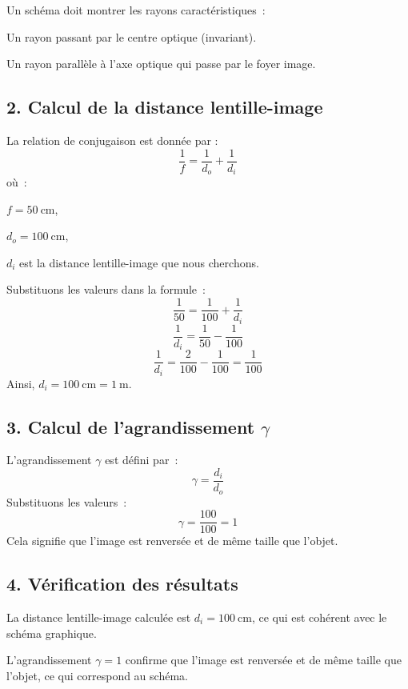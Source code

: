 \documentclass[answers]{exam}
\begin{document}
Un schéma doit montrer les rayons caractéristiques :
\begin{compactenum}
    \item Un rayon passant par le centre optique (invariant).
    \item Un rayon parallèle à l'axe optique qui passe par le foyer image.
\end{compactenum}

\subsection*{2. Calcul de la distance lentille-image}

La relation de conjugaison est donnée par :
\[
\frac{1}{f} = \frac{1}{d_o} + \frac{1}{d_i}
\]
où :
\begin{compactenum}
    \item $f = 50~\text{cm}$,
    \item $d_o = 100~\text{cm}$,
    \item $d_i$ est la distance lentille-image que nous cherchons.
\end{compactenum}

Substituons les valeurs dans la formule :
\[
\frac{1}{50} = \frac{1}{100} + \frac{1}{d_i}
\]
\[
\frac{1}{d_i} = \frac{1}{50} - \frac{1}{100}
\]
\[
\frac{1}{d_i} = \frac{2}{100} - \frac{1}{100} = \frac{1}{100}
\]
Ainsi, $d_i = 100~\text{cm} = 1~\text{m}$.

\subsection*{3. Calcul de l’agrandissement $\gamma$}

L'agrandissement $\gamma$ est défini par :
\[
\gamma = \frac{d_i}{d_o}
\]
Substituons les valeurs :
\[
\gamma = \frac{100}{100} = 1
\]
Cela signifie que l'image est renversée et de même taille que l'objet.

\subsection*{4. Vérification des résultats}

\begin{compactenum}
    \item La distance lentille-image calculée est $d_i = 100~\text{cm}$, ce qui est cohérent avec le schéma graphique.
    \item L'agrandissement $\gamma = 1$ confirme que l'image est renversée et de même taille que l'objet, ce qui correspond au schéma.
\end{compactenum}
\end{document}
